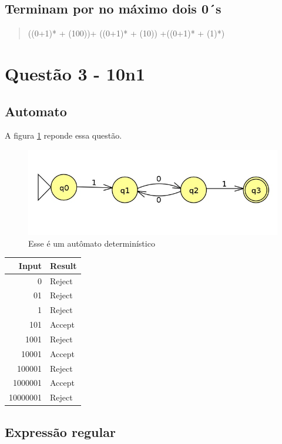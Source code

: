 \documentclass[11pt]{article}
\begin{document}
\subsection{Terminam por no máximo dois 0´s}
\label{sec:orgd66519e}
\begin{quote}
((0+1)* + (100))+ ((0+1)* + (10)) +((0+1)* + (1)*)
\end{quote}
\pagebreak
\section{Questão 3 - 10n1}
\label{sec:orgea1570a}
\subsection{Automato}
\label{sec:org4a57c10}
A figura \ref{fig:org779decc} reponde essa questão. 

\begin{figure}[htbp]
\centering
\includegraphics[width=.9\linewidth]{./q3/q3.jpg}
\caption{\label{fig:org779decc}
Esse é um autômato determinístico}
\end{figure}

\begin{center}
\begin{tabular}{rl}
Input & Result\\
\hline
0 & Reject\\
01 & Reject\\
1 & Reject\\
101 & Accept\\
1001 & Reject\\
10001 & Accept\\
100001 & Reject\\
1000001 & Accept\\
10000001 & Reject\\
\end{tabular}
\end{center}
\subsection{Expressão regular}
\label{sec:org13b3bdc}
\end{document}
